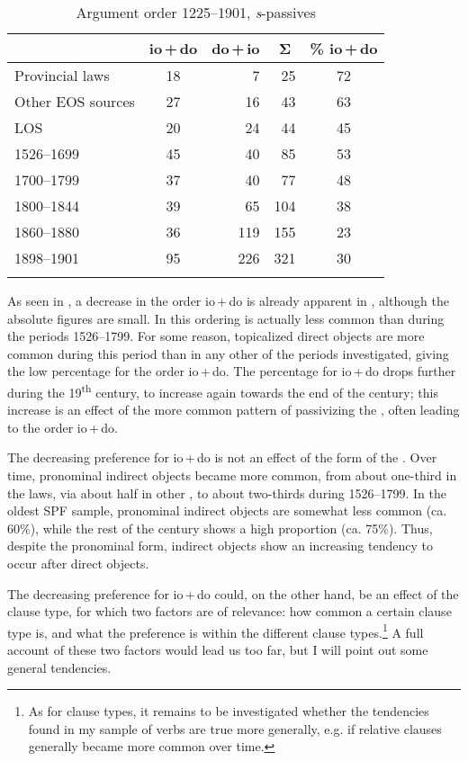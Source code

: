 \documentclass[output=paper]{langscibook}
\begin{document}
\begin{table}
\caption{Argument order 1225–1901, \textit{s}{}-passives}
\label{tab:falk:4}
\begin{tabular}{lcrrc}
\lsptoprule
& \multicolumn{1}{c}{io\,+\,do} & \multicolumn{1}{c}{do\,+\,io} & \multicolumn{1}{c}{Σ} & \multicolumn{1}{c}{\% io\,+\,do}\\\midrule
Provincial laws & 18 & 7 & 25 & 72\\
Other EOS sources & 27 & 16 & 43 & 63\\
LOS & 20 & 24 & 44 & 45\\
1526–1699 & 45 & 40 & 85 & 53\\
1700–1799 & 37 & 40 & 77 & 48\\
1800–1844 & 39 & 65 & 104 & 38\\
1860–1880 & 36 & 119 & 155 & 23 \\
1898–1901 & 95 & 226 & 321 & 30\\
\lspbottomrule
\end{tabular}
\end{table}

As seen in , a decrease in the order io\,+\,do is already apparent in , although the absolute figures are small. In  this ordering is actually less common than during the periods 1526–1799. For some reason, topicalized direct objects are more common during this period than in any other of the periods investigated, giving the low percentage for the order io\,+\,do. The percentage for io\,+\,do drops further during the 19\textsuperscript{th} century, to increase again towards the end of the century; this increase is an effect of the more common pattern of passivizing the , often leading to the order io\,+\,do.


The decreasing preference for io\,+\,do is not an effect of the form of the . Over time, pronominal indirect objects became more common, from about one-third in the laws, via about half in other , to about two-thirds during 1526–1799. In the oldest SPF sample, pronominal indirect objects are somewhat less common (ca. 60\%), while the rest of the century shows a high proportion (ca. 75\%). Thus, despite the pronominal form, indirect objects show an increasing tendency to occur after direct objects.



The decreasing preference for io\,+\,do could, on the other hand, be an effect of the clause type, for which two factors are of relevance: how common a certain clause type is, and what the preference is within the different clause types.\footnote{As for clause types, it remains to be investigated whether the tendencies found in my sample of   verbs are true more generally, e.g. if relative clauses generally became more common over time.}  A full account of these two factors would lead us too far, but I will point out some general tendencies.
\end{document}
